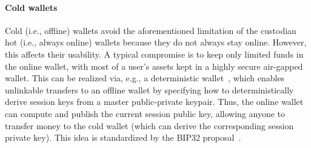 \paragraph{Cold wallets} Cold (i.e., offline) wallets avoid the aforementioned limitation of the custodian hot (i.e., always online) wallets because they do not always stay online. However, this affects their usability. A typical compromise is to keep only limited funds in the online wallet, with most of a user's assets kept in a highly secure air-gapped wallet. This can be realized via, e.g., a deterministic wallet~\cite{deterministic-wallets,CCS:DasFauLos19,CCS:ADEFKRS20,EPRINT:Hu23,ESORICS:ErwRia22}, which enables unlinkable transfers to an offline wallet by specifying how to deterministically derive session keys from a master public-private keypair. Thus, the online wallet can compute and publish the current session public key, allowing anyone to transfer money to the cold wallet (which can derive the corresponding session private key). 
This idea is standardized by the BIP32 proposal~\cite{bip32}. %

